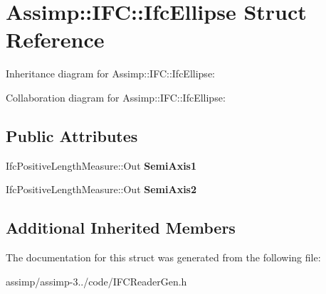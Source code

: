 \hypertarget{struct_assimp_1_1_i_f_c_1_1_ifc_ellipse}{\section{Assimp\+:\+:I\+F\+C\+:\+:Ifc\+Ellipse Struct Reference}
\label{struct_assimp_1_1_i_f_c_1_1_ifc_ellipse}
}


Inheritance diagram for Assimp\+:\+:I\+F\+C\+:\+:Ifc\+Ellipse\+:


Collaboration diagram for Assimp\+:\+:I\+F\+C\+:\+:Ifc\+Ellipse\+:
\subsection*{Public Attributes}
\begin{DoxyCompactItemize}
\item 
\hypertarget{struct_assimp_1_1_i_f_c_1_1_ifc_ellipse_a4720e05eca230304043ba52bbc9c4531}{Ifc\+Positive\+Length\+Measure\+::\+Out {\bfseries Semi\+Axis1}}\label{struct_assimp_1_1_i_f_c_1_1_ifc_ellipse_a4720e05eca230304043ba52bbc9c4531}

\item 
\hypertarget{struct_assimp_1_1_i_f_c_1_1_ifc_ellipse_ad38d5347262d0b9a16a5eade868b7718}{Ifc\+Positive\+Length\+Measure\+::\+Out {\bfseries Semi\+Axis2}}\label{struct_assimp_1_1_i_f_c_1_1_ifc_ellipse_ad38d5347262d0b9a16a5eade868b7718}

\end{DoxyCompactItemize}
\subsection*{Additional Inherited Members}


The documentation for this struct was generated from the following file\+:\begin{DoxyCompactItemize}
\item 
assimp/assimp-\/3../code/I\+F\+C\+Reader\+Gen.\+h\end{DoxyCompactItemize}

